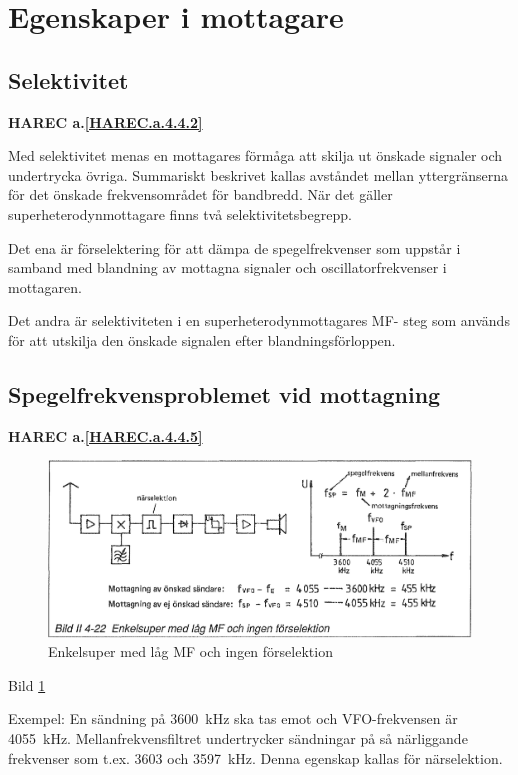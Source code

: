 \section{Egenskaper i mottagare}

\subsection{Selektivitet}
\textbf{HAREC a.\ref{HAREC.a.4.4.2}\label{myHAREC.a.4.4.2}}

Med selektivitet menas en mottagares förmåga att skilja ut önskade
signaler och undertrycka övriga. Summariskt beskrivet kallas avståndet
mellan yttergränserna för det önskade frekvensområdet för
bandbredd. När det gäller superheterodynmottagare finns två
selektivitetsbegrepp.

Det ena är förselektering för att dämpa de spegelfrekvenser som
uppstår i samband med blandning av mottagna signaler och
oscillatorfrekvenser i mottagaren.

Det andra är selektiviteten i en superheterodynmottagares MF- steg som används
för att utskilja den önskade signalen efter blandningsförloppen.

\subsection{Spegelfrekvensproblemet vid mottagning}
\textbf{HAREC a.\ref{HAREC.a.4.4.5}\label{myHAREC.a.4.4.5}}

\begin{figure}
  \includegraphics[width=\textwidth]{images/bild_2_4-22}
  \caption{Enkelsuper med låg MF och ingen förselektion}
  \label{fig:bildII4-22}
\end{figure}

Bild \ref{fig:bildII4-22}

Exempel: En sändning på 3600~kHz ska tas emot och VFO-frekvensen är
4055~kHz. Mellanfrekvensfiltret undertrycker sändningar på så
närliggande frekvenser som t.ex. 3603 och 3597~kHz. Denna egenskap
kallas för närselektion.

